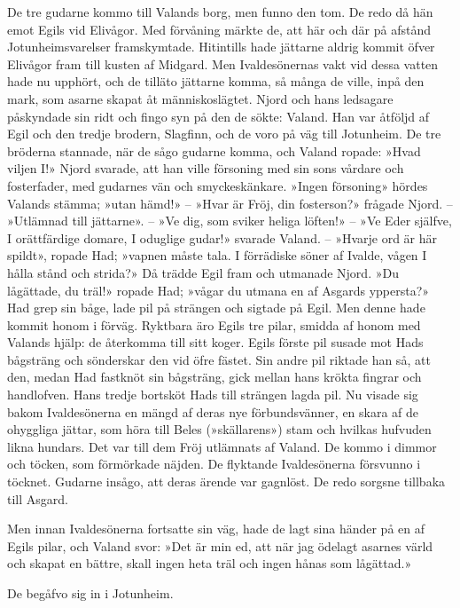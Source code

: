 De tre gudarne kommo till Valands borg, men funno den tom. De redo då
hän emot Egils vid Elivågor. Med förvåning märkte de, att här och där på
afstånd Jotunheimsvarelser framskymtade. Hitintills hade jättarne aldrig
kommit öfver Elivågor fram till kusten af Midgard. Men Ivaldesönernas
vakt vid dessa vatten hade nu upphört, och de tilläto jättarne komma, så
många de ville, inpå den mark, som asarne skapat åt människoslägtet.
Njord och hans ledsagare påskyndade sin ridt och fingo syn på den de
sökte: Valand. Han var åtföljd af Egil och den tredje brodern, Slagfinn,
och de voro på väg till Jotunheim. De tre bröderna stannade, när de sågo
gudarne komma, och Valand ropade: »Hvad viljen I!» Njord svarade, att
han ville försoning med sin sons vårdare och fosterfader, med gudarnes
vän och smyckeskänkare. »Ingen försoning» hördes Valands stämma; »utan
hämd!» -- »Hvar är Fröj, din fosterson?» frågade Njord. -- »Utlämnad
till jättarne». -- »Ve dig, som sviker heliga löften!» -- »Ve Eder
själfve, I orättfärdige domare, I oduglige gudar!» svarade Valand. --
»Hvarje ord är här spildt», ropade Had; »vapnen måste tala. I förrädiske
söner af Ivalde, vågen I hålla stånd och strida?» Då trädde Egil fram
och utmanade Njord. »Du lågättade,
du träl!» ropade Had; »vågar du utmana en af Asgards yppersta?» Had grep
sin båge, lade pil på strängen och sigtade på Egil. Men denne hade
kommit honom i förväg. Ryktbara äro Egils tre pilar, smidda af honom med
Valands hjälp: de återkomma till sitt koger. Egils förste pil susade mot
Hads bågsträng och sönderskar den vid öfre fästet. Sin andre pil riktade
han så, att den, medan Had fastknöt sin bågsträng, gick mellan hans
krökta fingrar och handlofven. Hans tredje bortsköt Hads till strängen
lagda pil. Nu visade sig bakom Ivaldesönerna en mängd af deras nye
förbundsvänner, en skara af de ohyggliga jättar, som höra till Beles
(»skällarens») stam och hvilkas hufvuden likna hundars. Det var till dem
Fröj utlämnats af Valand. De kommo i dimmor och töcken, som förmörkade
näjden. De flyktande Ivaldesönerna försvunno i töcknet. Gudarne insågo,
att deras ärende var gagnlöst. De redo sorgsne tillbaka till Asgard.

Men innan Ivaldesönerna fortsatte sin väg, hade de lagt sina händer på
en af Egils pilar, och Valand svor: »Det är min ed, att när jag ödelagt
asarnes värld och skapat en bättre, skall ingen heta träl och ingen
hånas som lågättad.»

De begåfvo sig in i Jotunheim.

\endSecII


